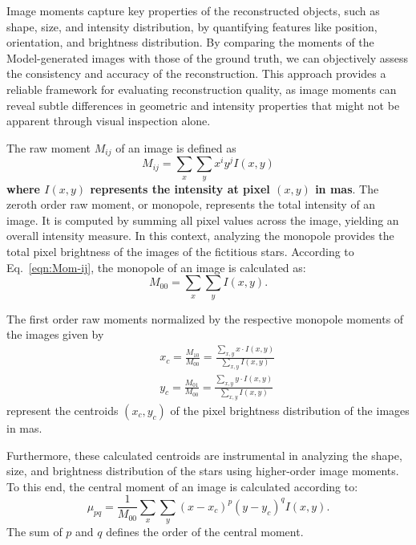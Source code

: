 Image moments capture key properties of the reconstructed objects, such as shape, size, and intensity distribution, by quantifying features like position, orientation, and brightness distribution. By comparing the moments of the Model-generated images with those of the ground truth, we can objectively assess the consistency and accuracy of the reconstruction. This approach provides a reliable framework for evaluating reconstruction quality, as image moments can reveal subtle differences in geometric and intensity properties that might not be apparent through visual inspection alone.

The raw moment $M_{ij}$ of an image is defined as \citep{hu1962visual}
\begin{equation}
	M_{ij} = \sum_{x} \sum_{y} x^i y^j I(x, y)
	\label{eqn:Mom-ij}
\end{equation}
{\bf where $I(x,y)$ represents the intensity at pixel $(x,y)$ in mas}. The zeroth order raw moment, or monopole, represents the total intensity of an image. It is computed by summing all pixel values across the image, yielding an overall intensity measure. In this context, analyzing the monopole provides the total pixel brightness of the images of the fictitious stars. According to Eq.~\eqref{eqn:Mom-ij}, the monopole of an image is calculated as:
\begin{equation}
	M_{00} = \sum_{x} \sum_{y} I(x, y).
	\label{eqn:Mom-00}
\end{equation}

The first order raw moments normalized by the respective monopole moments of the images given by 
\begin{eqnarray}
&&x_c = \frac{M_{10}}{M_{00}} = \frac{\sum_{x,y} x \cdot I(x,y)}{\sum_{x,y} I(x,y)} \nonumber \\
&&y_c = \frac{M_{01}}{M_{00}} = \frac{\sum_{x,y} y \cdot I(x,y)}{\sum_{x,y} I(x,y)}
\label{eqn:Centroid}
\end{eqnarray}
represent the centroids $(x_c, y_c)$ of the pixel brightness distribution of the images in mas.

Furthermore, these calculated centroids are instrumental in analyzing the shape, size, and brightness distribution of the stars using higher-order image moments. To this end, the central moment of an image is calculated according to:
\begin{equation}
	\mu_{pq} = \frac{1}{M_{00}}\sum_{x} \sum_{y} (x - x_c)^p (y - y_c)^q I(x, y).
\label{eqn:Central-Mom}
\end{equation}
The sum of \(p\) and \(q\) defines the order of the central moment. 

